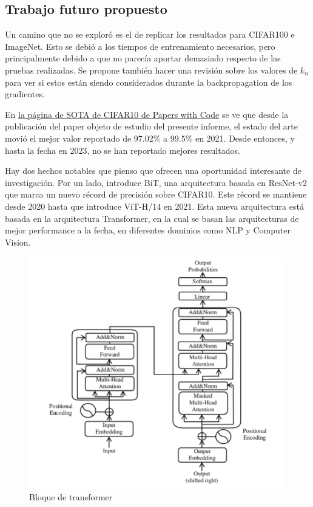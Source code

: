 \documentclass[titlepage,a4paper,oneside]{article}
\begin{document}
\subsection{Trabajo futuro propuesto}
Un camino que no se exploró es el de replicar los resultados para CIFAR100 e ImageNet. Esto se debió a los tiempos de entrenamiento necesarios, pero principalmente debido a que no parecía aportar demasiado respecto de las pruebas realizadas. Se propone también hacer una revisión sobre los valores de $k_n$ para ver si estos están siendo considerados durante la backpropagation de los gradientes.

En \href{https://paperswithcode.com/sota/image-classification-on-cifar-10}{la página de SOTA de CIFAR10 de Papers with Code} se ve que desde la publicación del paper objeto de estudio del presente informe, el estado del arte movió el mejor valor reportado de 97.02\% a 99.5\% en 2021. Desde entonces, y hasta la fecha en 2023, no se han reportado mejores resultados.

Hay dos hechos notables que pienso que ofrecen una oportunidad interesante de investigación. Por un lado, \cite{kolesnikov2020big} introduce BiT, una arquitectura basada en ResNet-v2 que marca un nuevo récord de precisión sobre CIFAR10. Este récord se mantiene desde 2020 hasta que \cite{dosovitskiy2021image} introduce ViT-H/14 en 2021. Esta nueva arquitectura está basada en \cite{vaswani2023attention} la arquitectura Transformer, en la cual se basan las arquitecturas de mejor performance a la fecha, en diferentes dominios como NLP y Computer Vision.

\begin{figure}[H]
\centering
\includegraphics[width=\textwidth]{images/TransformerBlock.png}
\caption{Bloque de transformer}
\label{transformer}
\end{figure}
\end{document}
